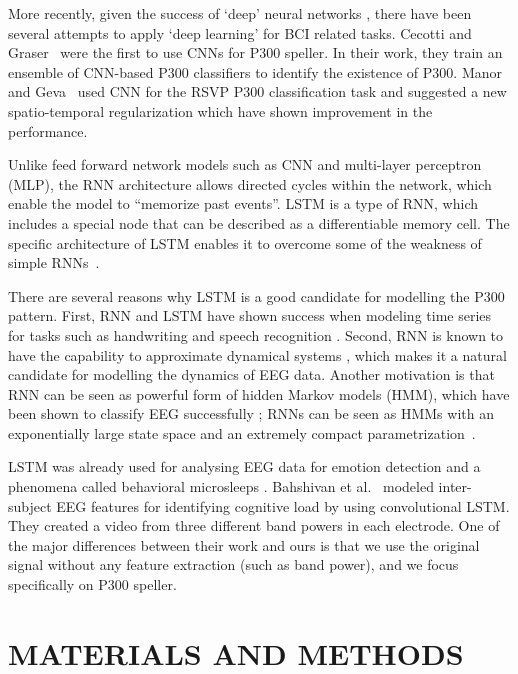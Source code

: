 \documentclass[
12pt, %
english, %
doublespacing, %
headsepline, %
]{MastersDoctoralThesis} %
\begin{document}
More recently, given the success of `deep' neural networks \cite{krizhevsky2012imagenet}, there have been several attempts to apply `deep learning' for BCI related tasks. Cecotti and Graser~\cite{P300_CNN} were the first to use CNNs  for P300 speller. In their work, they train an ensemble of CNN-based P300 classifiers to identify the existence of P300. Manor and Geva~\cite{RSVP_P300_geva} used CNN for the RSVP P300 classification task and suggested a new spatio-temporal regularization which have shown improvement in the performance.


Unlike feed forward network models such as CNN and multi-layer perceptron (MLP),  the RNN architecture allows directed cycles within the network, which enable the model to ``memorize past events''. LSTM \cite{LSTM_origin} is a type of RNN, which includes a special node that can be described as a differentiable memory cell. The specific architecture of LSTM enables it to overcome some of the weakness of simple RNNs~\cite{bengio1994learning}.

There are several reasons why LSTM is a good candidate for modelling the P300 pattern. First, RNN and LSTM have shown success when modeling time series for tasks such as handwriting and speech recognition \cite{graves2013speech,  graves2008unconstrained, yue2015beyond}. Second, RNN is known to have the capability to approximate dynamical systems \cite{li2005approximation}, which makes it a natural candidate for modelling the dynamics of EEG data. Another motivation is that RNN can be seen as powerful form of hidden Markov models (HMM), which have been shown to classify EEG successfully \cite{solhjoo2005classification,obermaier2001hidden,cincotti2003comparison}; RNNs can be seen as HMMs with an exponentially large state space and an extremely compact parametrization~\cite{sutskever2009recurrent}.

LSTM was already used for analysing EEG data for emotion detection \cite{soleymani2014continuous} and a phenomena called behavioral microsleeps \cite{davidson2005detecting}. Bahshivan et al.~\cite{LSTM_EEG} modeled inter-subject EEG features for identifying cognitive load by using convolutional LSTM. They created a video from three different band powers in each electrode. One of the major differences between their work and ours is that we use the original signal without any feature extraction (such as band power), and we focus specifically on P300 speller.



\chapter{MATERIALS AND METHODS}
\end{document}
